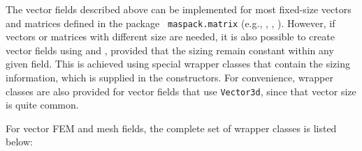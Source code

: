 The vector fields described above can be implemented for most
fixed-size vectors and matrices defined in the package {\tt
maspack.matrix} (e.g.,
,
,
).
However, if vectors or matrices with different size are needed,
it is also possible to create vector fields using
 and
, provided that the
sizing remain constant within any given field. This is achieved
using special wrapper classes that contain the sizing information,
which is supplied in the constructors. For convenience, wrapper
classes are also provided for vector fields that use {\tt Vector3d},
since that vector size is quite common.

For vector FEM and mesh fields, the complete set of wrapper classes is listed 
below:
%
